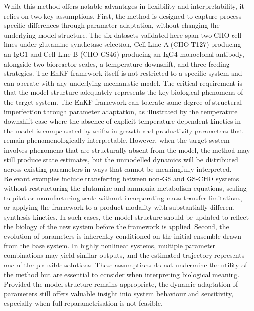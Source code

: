 While this method offers notable advantages in flexibility and interpretability, it relies on two key assumptions. First, the method is designed to capture process-specific differences through parameter adaptation, without changing the underlying model structure. {\color{blue} The six datasets validated here span two CHO cell lines under glutamine synthetase selection, Cell Line A (CHO-T127) producing an IgG1 and Cell Line B (CHO-GS46) producing an IgG4 monoclonal antibody, alongside two bioreactor scales, a temperature downshift, and three feeding strategies. The EnKF framework itself is not restricted to a specific system and can operate with any underlying mechanistic model. The critical requirement is that the model structure adequately represents the key biological phenomena of the target system. The EnKF framework can tolerate some degree of structural imperfection through parameter adaptation, as illustrated by the temperature downshift case where the absence of explicit temperature-dependent kinetics in the model is compensated by shifts in growth and productivity parameters that remain phenomenologically interpretable. However, when the target system involves phenomena that are structurally absent from the model, the method may still produce state estimates, but the unmodelled dynamics will be distributed across existing parameters in ways that cannot be meaningfully interpreted. Relevant examples include transferring between non-GS and GS-CHO systems without restructuring the glutamine and ammonia metabolism equations, scaling to pilot or manufacturing scale without incorporating mass transfer limitations, or applying the framework to a product modality with substantially different synthesis kinetics. In such cases, the model structure should be updated to reflect the biology of the new system before the framework is applied.} Second, the evolution of parameters is inherently conditioned on the initial ensemble drawn from the base system. In highly nonlinear systems, multiple parameter combinations may yield similar outputs, and the estimated trajectory represents one of the plausible solutions. These assumptions do not undermine the utility of the method but are essential to consider when interpreting biological meaning. Provided the model structure remains appropriate, the dynamic adaptation of parameters still offers valuable insight into system behaviour and sensitivity, especially when full reparametrisation is not feasible.

